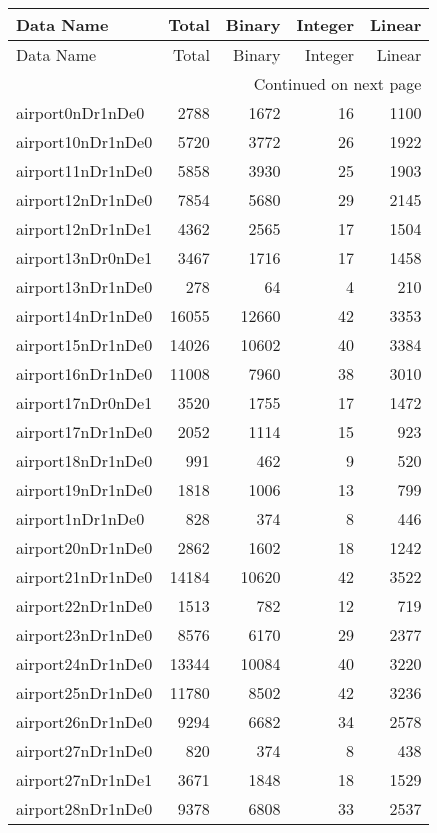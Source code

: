 
\begin{longtable}{lrrrr}
\toprule
Data Name & Total & Binary & Integer & Linear \\
\midrule
\endfirsthead
\toprule
Data Name & Total & Binary & Integer & Linear \\
\midrule
\endhead
\midrule
\multicolumn{5}{r}{Continued on next page} \\
\midrule
\endfoot
\bottomrule
\endlastfoot
airport0nDr1nDe0 & 2788 & 1672 & 16 & 1100 \\
airport10nDr1nDe0 & 5720 & 3772 & 26 & 1922 \\
airport11nDr1nDe0 & 5858 & 3930 & 25 & 1903 \\
airport12nDr1nDe0 & 7854 & 5680 & 29 & 2145 \\
airport12nDr1nDe1 & 4362 & 2565 & 17 & 1504 \\
airport13nDr0nDe1 & 3467 & 1716 & 17 & 1458 \\
airport13nDr1nDe0 & 278 & 64 & 4 & 210 \\
airport14nDr1nDe0 & 16055 & 12660 & 42 & 3353 \\
airport15nDr1nDe0 & 14026 & 10602 & 40 & 3384 \\
airport16nDr1nDe0 & 11008 & 7960 & 38 & 3010 \\
airport17nDr0nDe1 & 3520 & 1755 & 17 & 1472 \\
airport17nDr1nDe0 & 2052 & 1114 & 15 & 923 \\
airport18nDr1nDe0 & 991 & 462 & 9 & 520 \\
airport19nDr1nDe0 & 1818 & 1006 & 13 & 799 \\
airport1nDr1nDe0 & 828 & 374 & 8 & 446 \\
airport20nDr1nDe0 & 2862 & 1602 & 18 & 1242 \\
airport21nDr1nDe0 & 14184 & 10620 & 42 & 3522 \\
airport22nDr1nDe0 & 1513 & 782 & 12 & 719 \\
airport23nDr1nDe0 & 8576 & 6170 & 29 & 2377 \\
airport24nDr1nDe0 & 13344 & 10084 & 40 & 3220 \\
airport25nDr1nDe0 & 11780 & 8502 & 42 & 3236 \\
airport26nDr1nDe0 & 9294 & 6682 & 34 & 2578 \\
airport27nDr1nDe0 & 820 & 374 & 8 & 438 \\
airport27nDr1nDe1 & 3671 & 1848 & 18 & 1529 \\
airport28nDr1nDe0 & 9378 & 6808 & 33 & 2537 \\

\end{longtable}
